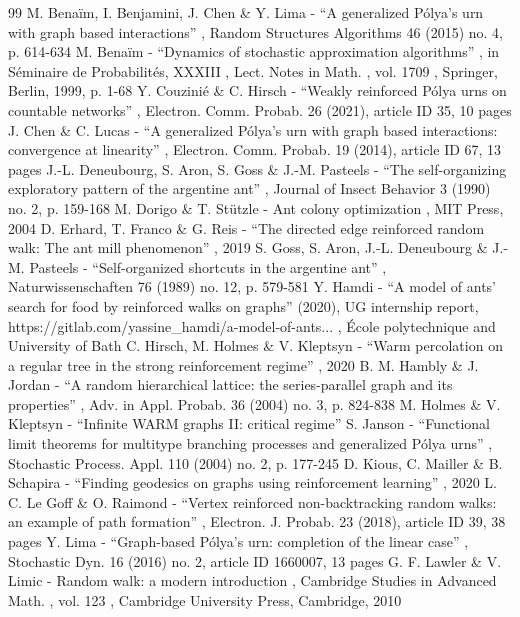 \documentclass[11pt]{article}
\numberwithin{equation}{section}
\theoremstyle{definition}
\begin{document}
\begin{thebibliography}{99}
 M. Benaïm, I. Benjamini, J. Chen \& Y. Lima - “A generalized Pólya’s urn with graph based interactions” , Random Structures Algorithms 46 (2015) no. 4, p. 614-634
 M. Benaïm - “Dynamics of stochastic approximation algorithms” , in Séminaire de Probabilités, XXXIII , Lect. Notes in Math. , vol. 1709 , Springer, Berlin, 1999, p. 1-68
 Y. Couzinié \& C. Hirsch - “Weakly reinforced Pólya urns on countable networks” , Electron. Comm. Probab. 26 (2021), article ID 35, 10 pages
 J. Chen \& C. Lucas - “A generalized Pólya’s urn with graph based interactions: convergence at linearity” , Electron. Comm. Probab. 19 (2014), article ID 67, 13 pages
 J.-L. Deneubourg, S. Aron, S. Goss \& J.-M. Pasteels - “The self-organizing exploratory pattern of the argentine ant” , Journal of Insect Behavior 3 (1990) no. 2, p. 159-168
 M. Dorigo \& T. Stützle - Ant colony optimization , MIT Press, 2004
 D. Erhard, T. Franco \& G. Reis - “The directed edge reinforced random walk: The ant mill phenomenon” , 2019
 S. Goss, S. Aron, J.-L. Deneubourg \& J.-M. Pasteels - “Self-organized shortcuts in the argentine ant” , Naturwissenschaften 76 (1989) no. 12, p. 579-581
 Y. Hamdi - “A model of ants’ search for food by reinforced walks on graphs” (2020), UG internship report, https://gitlab.com/yassine\_hamdi/a-model-of-ants... , École polytechnique and University of Bath
 C. Hirsch, M. Holmes \& V. Kleptsyn - “Warm percolation on a regular tree in the strong reinforcement regime” , 2020
 B. M. Hambly \& J. Jordan - “A random hierarchical lattice: the series-parallel graph and its properties” , Adv. in Appl. Probab. 36 (2004) no. 3, p. 824-838
 M. Holmes \& V. Kleptsyn - “Infinite WARM graphs II: critical regime”
 S. Janson - “Functional limit theorems for multitype branching processes and generalized Pólya urns” , Stochastic Process. Appl. 110 (2004) no. 2, p. 177-245
 D. Kious, C. Mailler \& B. Schapira - “Finding geodesics on graphs using reinforcement learning” , 2020
 L. C. Le Goff \& O. Raimond - “Vertex reinforced non-backtracking random walks: an example of path formation” , Electron. J. Probab. 23 (2018), article ID 39, 38 pages
 Y. Lima - “Graph-based Pólya’s urn: completion of the linear case” , Stochastic Dyn. 16 (2016) no. 2, article ID 1660007, 13 pages
 G. F. Lawler \& V. Limic - Random walk: a modern introduction , Cambridge Studies in Advanced Math. , vol. 123 , Cambridge University Press, Cambridge, 2010

\end{thebibliography}
\end{document}
